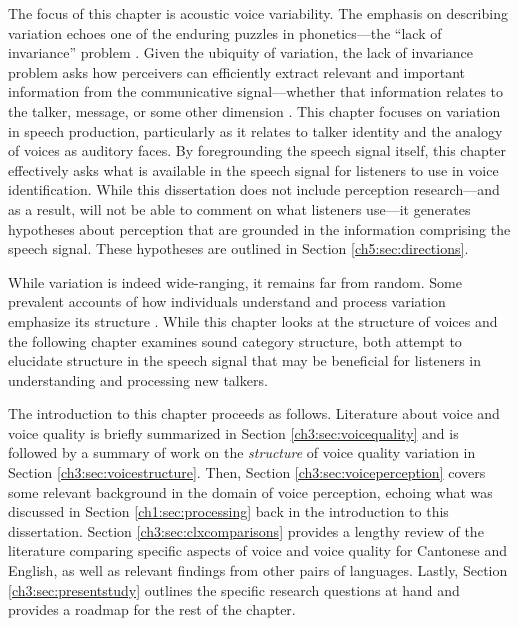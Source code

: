 The focus of this chapter is acoustic voice variability. The emphasis on describing variation echoes one of the enduring puzzles in phonetics---the ``lack of invariance'' problem \citep{liberman_1967_perception}. Given the ubiquity of variation, the lack of invariance problem asks how perceivers can efficiently extract relevant and important information from the communicative signal---whether that information relates to the talker, message, or some other dimension \citep{kleinschmidt_2018_sociolinguistic}. This chapter focuses on variation in speech production, particularly as it relates to talker identity and the analogy of voices as auditory faces. By foregrounding the speech signal itself, this chapter effectively asks what is available in the speech signal for listeners to use in voice identification. While this dissertation does not include perception research---and as a result, will not be able to comment on what listeners use---it generates hypotheses about perception that are grounded in the information comprising the speech signal. These hypotheses are outlined in Section \ref{ch5:sec:directions}.

While variation is indeed wide-ranging, it remains far from random. Some prevalent accounts of how individuals understand and process variation emphasize its structure \citep[e.g.,][]{chodroff_2017_structure, lee_2019_acoustic}. While this chapter looks at the structure of voices and the following chapter examines sound category structure, both attempt to elucidate structure in the speech signal that may be beneficial for listeners in understanding and processing new talkers. 

The introduction to this chapter proceeds as follows. Literature about voice and voice quality is briefly summarized in Section \ref{ch3:sec:voicequality} and is followed by a summary of work on the \textit{structure} of voice quality variation in Section \ref{ch3:sec:voicestructure}. Then, Section \ref{ch3:sec:voiceperception} covers some relevant background in the domain of voice perception, echoing what was discussed in Section \ref{ch1:sec:processing} back in the introduction to this dissertation. Section \ref{ch3:sec:clxcomparisons} provides a lengthy review of the literature comparing specific aspects of voice and voice quality for Cantonese and English, as well as relevant findings from other pairs of languages. Lastly, Section \ref{ch3:sec:presentstudy} outlines the specific research questions at hand and provides a roadmap for the rest of the chapter. 

